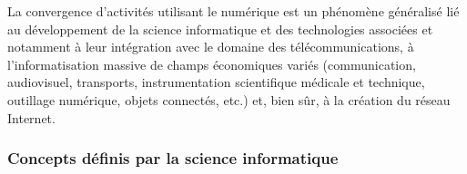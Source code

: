 La convergence d’activités utilisant le numérique est un phénomène généralisé lié au développement de la science informatique et des technologies associées et notamment à leur intégration avec le domaine des télécommunications, à l’informatisation massive de champs économiques variés (communication, audiovisuel, transports, instrumentation scientifique médicale et technique, outillage numérique, objets connectés, etc.) et, bien sûr, à la création du réseau Internet.



\subsubsection*{Concepts définis par la science informatique}

